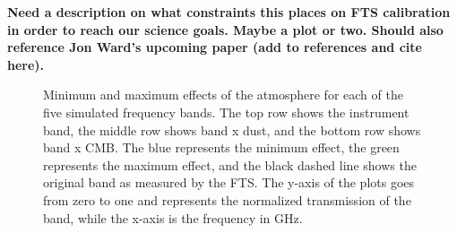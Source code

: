 \textbf{Need a description on what constraints this places on FTS calibration in order to reach our science goals. Maybe a plot or two. Should also reference Jon Ward's upcoming paper (add to references and cite here).}

\begin{figure}[H]
\centering
 \begin{varwidth}{\linewidth}
 \hspace{-2.5mm}
 \hspace{-2.5mm}
 \hspace{-2.5mm}
 \hspace{-2.5mm}
 \end{varwidth}
 \begin{varwidth}{\linewidth}
 \hspace{-2.5mm}
 \hspace{-2.5mm}
 \hspace{-2.5mm}
 \hspace{-2.5mm}
 \end{varwidth}
 \begin{varwidth}{\linewidth}
 \hspace{-2.5mm}
 \hspace{-2.5mm}
 \hspace{-2.5mm}
 \hspace{-2.5mm} 
 \end{varwidth}
\caption{Minimum and maximum effects of the atmosphere for each of the five simulated frequency bands.  The top row shows the instrument band, the middle row shows band x dust, and the bottom row shows band x CMB.  The blue represents the minimum effect, the green represents the maximum effect, and the black dashed line shows the original band as measured by the FTS.  The y-axis of the plots goes from zero to one and represents the normalized transmission of the band, while the x-axis is the frequency in GHz.}
\label{minmax_bands}
\end{figure}

